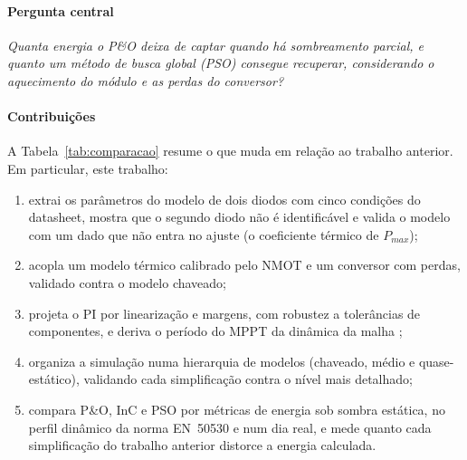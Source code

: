 \documentclass[3p,authoryear]{elsarticle}
\begin{document}
\paragraph{Pergunta central} \emph{Quanta energia o P\&O deixa de captar quando há
sombreamento parcial, e quanto um método de busca global (PSO) consegue recuperar,
considerando o aquecimento do módulo e as perdas do conversor?}

\paragraph{Contribuições} A Tabela~\ref{tab:comparacao} resume o que muda em relação ao
trabalho anterior. Em particular, este trabalho:
\begin{enumerate}[label=(\roman*)]
\item extrai os parâmetros do modelo de dois diodos com cinco condições do datasheet, mostra
que o segundo diodo não é identificável e valida o modelo com um dado que não entra no
ajuste (o coeficiente térmico de $P_{max}$);
\item acopla um modelo térmico calibrado pelo NMOT e um conversor com perdas, validado
contra o modelo chaveado;
\item projeta o PI por linearização e margens, com robustez a tolerâncias de componentes,
e deriva o período do MPPT da dinâmica da malha \citep{femia};
\item organiza a simulação numa hierarquia de modelos (chaveado, médio e quase-estático),
validando cada simplificação contra o nível mais detalhado;
\item compara P\&O, InC e PSO por métricas de energia sob sombra estática, no perfil
dinâmico da norma EN~50530 e num dia real, e mede quanto cada simplificação do trabalho
anterior distorce a energia calculada.
\end{enumerate}
\end{document}
